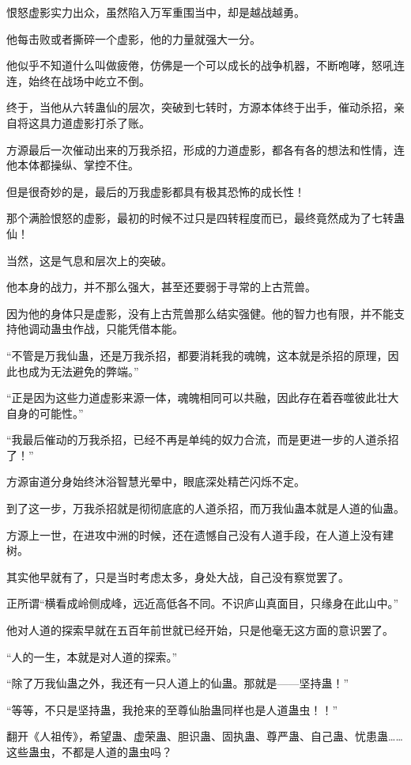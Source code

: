 \begin{this_body}
恨怒虚影实力出众，虽然陷入万军重围当中，却是越战越勇。

他每击败或者撕碎一个虚影，他的力量就强大一分。

他似乎不知道什么叫做疲倦，仿佛是一个可以成长的战争机器，不断咆哮，怒吼连连，始终在战场中屹立不倒。

终于，当他从六转蛊仙的层次，突破到七转时，方源本体终于出手，催动杀招，亲自将这具力道虚影打杀了账。

方源最后一次催动出来的万我杀招，形成的力道虚影，都各有各的想法和性情，连他本体都操纵、掌控不住。

但是很奇妙的是，最后的万我虚影都具有极其恐怖的成长性！

那个满脸恨怒的虚影，最初的时候不过只是四转程度而已，最终竟然成为了七转蛊仙！

当然，这是气息和层次上的突破。

他本身的战力，并不那么强大，甚至还要弱于寻常的上古荒兽。

因为他的身体只是虚影，没有上古荒兽那么结实强健。他的智力也有限，并不能支持他调动蛊虫作战，只能凭借本能。

“不管是万我仙蛊，还是万我杀招，都要消耗我的魂魄，这本就是杀招的原理，因此也成为无法避免的弊端。”

“正是因为这些力道虚影来源一体，魂魄相同可以共融，因此存在着吞噬彼此壮大自身的可能性。”

“我最后催动的万我杀招，已经不再是单纯的奴力合流，而是更进一步的人道杀招了！”

方源宙道分身始终沐浴智慧光晕中，眼底深处精芒闪烁不定。

到了这一步，万我杀招就是彻彻底底的人道杀招，而万我仙蛊本就是人道的仙蛊。

方源上一世，在进攻中洲的时候，还在遗憾自己没有人道手段，在人道上没有建树。

其实他早就有了，只是当时考虑太多，身处大战，自己没有察觉罢了。

正所谓“横看成岭侧成峰，远近高低各不同。不识庐山真面目，只缘身在此山中。”

他对人道的探索早就在五百年前世就已经开始，只是他毫无这方面的意识罢了。

“人的一生，本就是对人道的探索。”

“除了万我仙蛊之外，我还有一只人道上的仙蛊。那就是——坚持蛊！”

“等等，不只是坚持蛊，我抢来的至尊仙胎蛊同样也是人道蛊虫！！”

翻开《人祖传》，希望蛊、虚荣蛊、胆识蛊、固执蛊、尊严蛊、自己蛊、忧患蛊……这些蛊虫，不都是人道的蛊虫吗？


\end{this_body}
